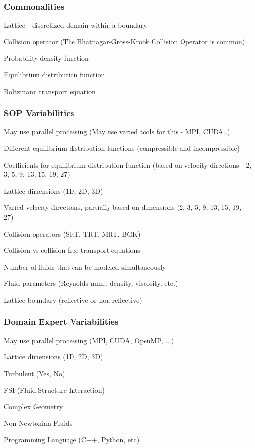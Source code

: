 \documentclass[t,12pt,numbers,fleqn]{beamer}
\begin{document}

\begin{frame}
\frametitle{Commonalities}

\bi
	\item Lattice - discretized domain within a boundary
	\item Collision operator (The Bhatnagar-Gross-Krook Collision Operator is common)
	\item Probability density function
	\item Equilibrium distribution function
	\item Boltzmann transport equation
\ei

\end{frame}


\begin{frame}
\frametitle{SOP Variabilities}

\bi
\item May use parallel processing (May use varied tools for this - MPI, CUDA..)
\item Different equilibrium distribution functions (compressible and incompressible)
\item Coefficients for equilibrium distribution function (based on velocity
  directions - 2, 3, 5, 9, 13, 15, 19, 27)
\item Lattice dimensions (1D, 2D, 3D)
\item Varied velocity directions, partially based on dimensions (2, 3, 5, 9, 13,
  15, 19, 27)
\item Collision operators (SRT, TRT, MRT, BGK)
\item Collision vs collision-free transport equations
\item Number of fluids that can be modeled simultaneously
\item Fluid parameters (Reynolds num., density, viscosity, etc.)
\item Lattice boundary (reflective or non-reflective)
\ei

\end{frame}


\begin{frame}
\frametitle{Domain Expert Variabilities}

\bi
\item May use parallel processing (MPI, CUDA, OpenMP, ...)
\item Lattice dimensions (1D, 2D, 3D)
\item Turbulent (Yes, No)
\item FSI (Fluid Structure Interaction)
\item Complex Geometry
\item Non-Newtonian Fluids
\item Programming Language (C++, Python, etc)
\ei

\end{frame}
\end{document}
